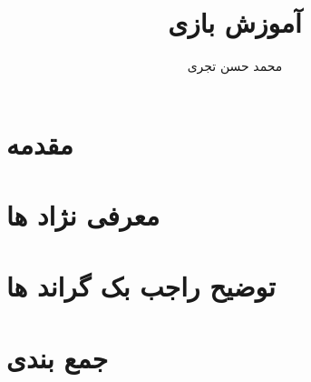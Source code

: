 \documentclass{report}
\title{{\Huge آموزش بازی \lr{dungeon crawl stone soup}}}
\author{{\LARGE محمد حسن تجری}}
\date{{\LARGE}}
\begin{document}
\maketitle

\begin{persian}

  \tableofcontents

  \chapter*{مقدمه}

  \chapter{معرفی نژاد ها}

  \chapter{توضیح راجب بک گراند ها}

  \chapter*{جمع بندی}

\end{persian}
\end{document}

